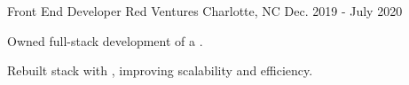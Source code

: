 \begin{cventries}
  \cventry
    {Front End Developer} %
    {Red Ventures} %
    {Charlotte, NC} %
    {Dec. 2019 - July 2020} %
    {
      \begin{cvitems} %
        \item {Owned full-stack development of a .}
        \item {Rebuilt stack with , improving scalability and efficiency.}
      \end{cvitems}
    }


\end{cventries}
